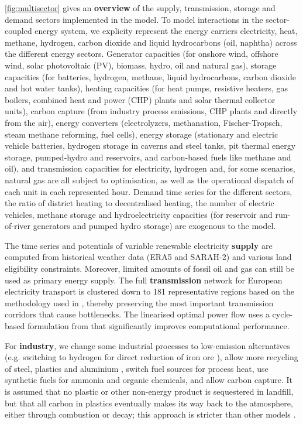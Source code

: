 \cref{fig:multisector} gives an \textbf{overview} of the supply, transmission,
storage and demand sectors implemented in the model. To model interactions in
the sector-coupled energy system, we explicity represent the energy carriers
electricity, heat, methane, hydrogen, carbon dioxide and liquid hydrocarbons
(oil, naphtha) across the different energy sectors. Generator capacities (for
onshore wind, offshore wind, solar photovoltaic (PV), biomass, hydro, oil and
natural gas), storage capacities (for batteries, hydrogen, methane, liquid
hydrocarbons, carbon dioxide and hot water tanks), heating capacities (for heat
pumps, resistive heaters, gas boilers, combined heat and power (CHP) plants and
solar thermal collector units), carbon capture (from industry process emissions,
CHP plants and directly from the air), energy converters (electrolyzers,
methanation, Fischer-Tropsch, steam methane reforming, fuel cells), energy
storage (stationary and electric vehicle batteries, hydrogen storage in caverns
and steel tanks, pit thermal energy storage, pumped-hydro and reservoirs, and
carbon-based fuels like methane and oil), and transmission capacities for
electricity, hydrogen and, for some scenarios, natural gas are all subject to
optimisation, as well as the operational dispatch of each unit in each
represented hour. Demand time series for the different sectors, the ratio of
district heating to decentralised heating, the number of electric vehicles,
methane storage and hydroelectricity capacities (for reservoir and run-of-river
generators and pumped hydro storage) are exogenous to the model.

The time series and potentials of variable renewable electricity \textbf{supply}
are computed from historical weather data (ERA5 and SARAH-2) and various land
eligibility constraints. Moreover, limited amounts of fossil oil and gas can
still be used as primary energy supply. The full \textbf{transmission} network
for European electricity transport \cite{horschPyPSAEurOpen2018} is clustered
down to 181 representative regions based on the methodology used in
\cite{Hoersch2017,frysztackiStrongEffect2021}, thereby preserving the most
important transmission corridors that cause bottlenecks. The linearised optimal
power flow uses a cycle-based formulation from \cite{horschLinearOptimal2018}
that significantly improves computational performance.

For \textbf{industry}, we change some industrial processes to low-emission
alternatives (e.g. switching to hydrogen for direct reduction of iron ore
\cite{voglAssessmentHydrogen2018}), allow more recycling of steel, plastics and
aluminium \cite{circular_economy}, switch fuel sources for process heat, use
synthetic fuels for ammonia and organic chemicals, and allow carbon capture. It
is assumed that no plastic or other non-energy product is sequestered in
landfill, but that all carbon in plastics eventually makes its way back to the
atmosphere, either through combustion or decay; this approach is stricter than
other models \cite{in-depth_2018}.

